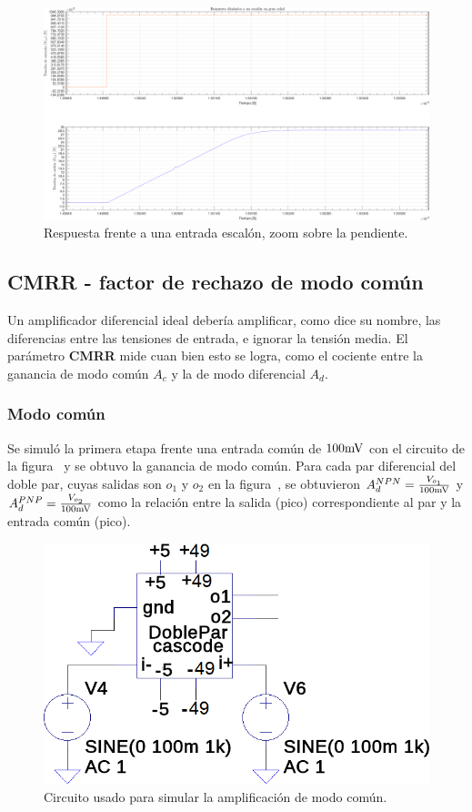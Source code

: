\clearpage

\begin{figure}[H]
	\centering
	\includegraphics[width=0.7\paperheight, angle=90]{img/sims/Slew_Rate_Zoom.png}
	\caption{Respuesta frente a una entrada escalón, zoom sobre la pendiente.}
	\label{fig:slew_zoom}
\end{figure}

\clearpage

\subsection{CMRR - factor de rechazo de modo común}

Un amplificador diferencial ideal debería amplificar, como dice su nombre, las diferencias entre las tensiones de entrada, e ignorar la tensión media. El parámetro \textbf{CMRR} mide cuan bien esto se logra, como el cociente entre la ganancia de modo común $A_{c}$ y la de modo diferencial $A_{d}$. 

\subsubsection{Modo común} 

Se simuló la primera etapa frente una entrada común de $100 \si[per-mode=symbol]{\milli\volt}$ con el circuito de la figura~ y se obtuvo la ganancia de modo común. Para cada par diferencial del doble par, cuyas salidas son $o_{1}$ y $o_{2}$ en la figura~, se obtuvieron $A_{d}^{NPN}=\frac{V_{o_{1}}}{100 \si[per-mode=symbol]{\milli\volt}}$ y $A_{d}^{PNP}=\frac{V_{o_{2}}}{100 \si[per-mode=symbol]{\milli\volt}}$ como la relación entre la salida (pico) correspondiente al par y la entrada común (pico). 


\begin{figure}[H]
	\centering
	\includegraphics[height=0.2\textwidth]{img/sims/ac.png}
	\caption{Circuito usado para simular la amplificación de modo común.}
	\label{fig:ac}
\end{figure}

